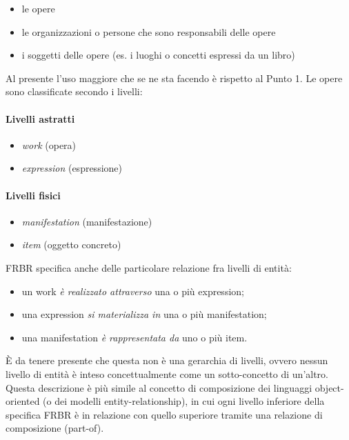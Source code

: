 \begin{itemize}
	\item le opere
	\item le organizzazioni o persone che sono responsabili delle opere
	\item i soggetti delle opere (es. i luoghi o concetti espressi da un libro)
\end{itemize}
\noindent
Al presente l'uso maggiore che se ne sta facendo è rispetto al Punto 1. Le opere sono classificate secondo i livelli:
\paragraph{Livelli astratti}
	\begin{itemize}
		\item \textit{work} (opera)
		\item \textit{expression} (espressione)
	\end{itemize}
\paragraph{Livelli fisici}
	\begin{itemize}
		\item \textit{manifestation} (manifestazione)
		\item \textit{item} (oggetto concreto)
	\end{itemize}
\noindent
FRBR specifica anche delle particolare relazione fra livelli di entità:
\begin{itemize}
	\item un work \textit{è realizzato attraverso} una o più expression;
	\item una expression \textit{si materializza in} una o più manifestation;
	\item una manifestation \textit{è rappresentata da} uno o più item.
\end{itemize}
\noindent
È da tenere presente che questa non è una gerarchia di livelli, ovvero nessun livello di entità è inteso concettualmente come un sotto-concetto di un'altro. 
Questa descrizione è più simile al concetto di composizione dei linguaggi object-oriented (o dei modelli entity-relationship), in cui ogni livello inferiore 
della specifica FRBR è in relazione con quello superiore tramite una relazione di composizione (part-of).

